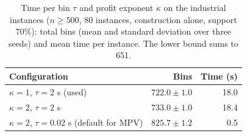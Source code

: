 \begin{table}[t]
\centering
\small\setlength{\tabcolsep}{4pt}
\caption{Time per bin $\tau$ and profit exponent $\kappa$ on the industrial instances ($n\ge 500$, 80 instances, construction alone, support 70\%): total bins (mean and standard deviation over three seeds) and mean time per instance. The lower bound sums to 651.}
\label{tab:e-indkappa}
\begin{tabular}{@{}lrr@{}}
\toprule
Configuration & Bins & Time (s)\\
\midrule
$\kappa=1$, $\tau=2$ s (used) & $722.0\pm 1.0$ & 18.0\\
$\kappa=2$, $\tau=2$ s & $733.0\pm 1.0$ & 18.4\\
$\kappa=2$, $\tau=0.02$ s (default for MPV) & $825.7\pm 1.2$ & 0.5\\
\bottomrule
\end{tabular}
\end{table}

